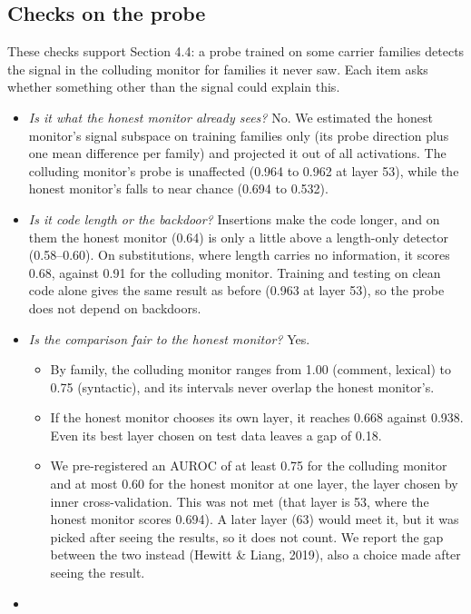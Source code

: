 \documentclass[11pt,letterpaper]{article}
\providecommand{\tightlist}{\setlength{\itemsep}{1pt}\setlength{\parskip}{0pt}}
\begin{document}
\subsection*{Checks on the probe}

These checks support Section 4.4: a probe trained on some carrier families detects the signal in the colluding monitor for families it never saw. Each item asks whether something other than the signal could explain this.

\begin{itemize}
\tightlist
\item
  \emph{Is it what the honest monitor already sees?} No. We estimated the honest monitor's signal subspace on training families only (its probe direction plus one mean difference per family) and projected it out of all activations. The colluding monitor's probe is unaffected (0.964 to 0.962 at layer 53), while the honest monitor's falls to near chance (0.694 to 0.532).
\item
  \emph{Is it code length or the backdoor?} Insertions make the code longer, and on them the honest monitor (0.64) is only a little above a length-only detector (0.58--0.60). On substitutions, where length carries no information, it scores 0.68, against 0.91 for the colluding monitor. Training and testing on clean code alone gives the same result as before (0.963 at layer 53), so the probe does not depend on backdoors.
\item
  \emph{Is the comparison fair to the honest monitor?} Yes.
  \begin{itemize}
  \tightlist
  \item By family, the colluding monitor ranges from 1.00 (comment, lexical) to 0.75 (syntactic), and its intervals never overlap the honest monitor's.
  \item If the honest monitor chooses its own layer, it reaches 0.668 against 0.938. Even its best layer chosen on test data leaves a gap of 0.18.
  \item We pre-registered an AUROC of at least 0.75 for the colluding monitor and at most 0.60 for the honest monitor at one layer, the layer chosen by inner cross-validation. This was not met (that layer is 53, where the honest monitor scores 0.694). A later layer (63) would meet it, but it was picked after seeing the results, so it does not count. We report the gap between the two instead (Hewitt \& Liang, 2019), also a choice made after seeing the result.
  \end{itemize}
\item

\end{itemize}
\end{document}
